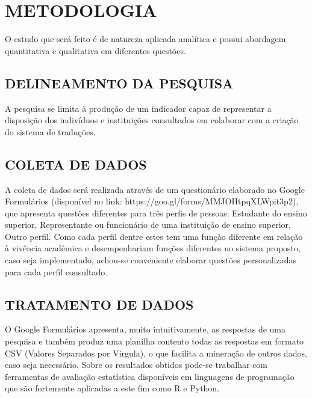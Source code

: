 
\chapter{METODOLOGIA}
\label{chap:metodologia}
O estudo que será feito é de natureza aplicada analítica e possui abordagem quantitativa e qualitativa em diferentes questões.

\section{DELINEAMENTO DA PESQUISA}
\label{sec:MetDelPesq}
A pesquisa se limita à produção de um indicador capaz de representar a disposição dos indivíduos e instituições consultados em colaborar com a criação do sistema de traduções.

\section{COLETA DE DADOS}
\label{sec:MetColDad}
A coleta de dados será realizada através de um questionário elaborado no Google Formulários (disponível no link: https://goo.gl/forms/MMJOHtpqXLWpit3p2), que apresenta questões diferentes para três perfis de pessoas: Estudante do ensino superior, Representante ou funcionário de uma instituição de ensino superior, Outro perfil. Como cada perfil dentre estes tem uma função diferente em relação à vivência acadêmica e desempenhariam funções diferentes no sistema proposto, caso seja implementado, achou-se conveniente elaborar questões personalizadas para cada perfil consultado.

\section{TRATAMENTO DE DADOS}
\label{sec:MetTratDad}
O Google Formulários apresenta, muito intuitivamente, as respostas de uma pesquisa e também produz uma planilha contento todas as respostas em formato CSV (Valores Separados por Virgula), o que facilita a mineração de outros dados, caso seja necessário. Sobre os resultados obtidos pode-se trabalhar com ferramentas de avaliação estatística disponíveis em linguagens de programação que são fortemente aplicadas a este fim como R e Python.
